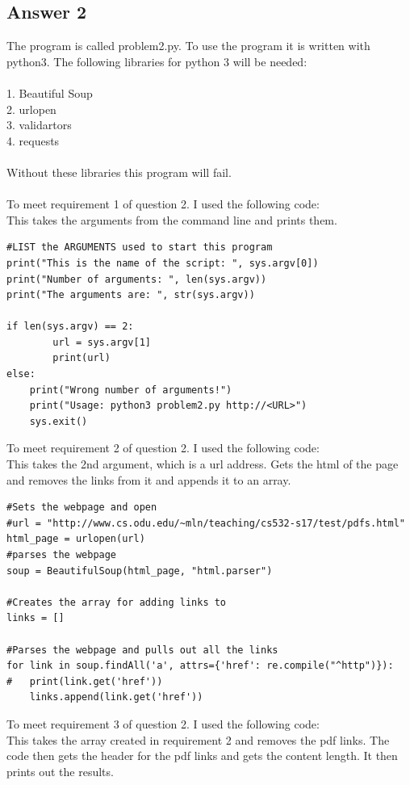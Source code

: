 \documentclass[10pt,letterpaper]{article}
\begin{document}
\subsection{Answer 2}
The program is called problem2.py.  To use the program it is written with python3.  The following libraries for python 3 will be needed:\\
\\
1. Beautiful Soup\\
2. urlopen\\
3. validartors\\
4. requests\\
\\
Without these libraries this program will fail.\\
\\
To meet requirement 1 of question 2.  I used the following code:\\
This takes the arguments from the command line and prints them.
\begin{lstlisting}
#LIST the ARGUMENTS used to start this program
print("This is the name of the script: ", sys.argv[0])
print("Number of arguments: ", len(sys.argv))
print("The arguments are: ", str(sys.argv))

if len(sys.argv) == 2:
        url = sys.argv[1]
        print(url)
else:
	print("Wrong number of arguments!")
	print("Usage: python3 problem2.py http://<URL>")
	sys.exit()
\end{lstlisting}
To meet requirement 2 of question 2. I used the following code:\\
This takes the 2nd argument, which is a url address.  Gets the html of the page and removes the links from it and appends it to an array.
\cite{bsdoc_2015}
\cite{digitalocean_2017}
\begin{lstlisting}
#Sets the webpage and open
#url = "http://www.cs.odu.edu/~mln/teaching/cs532-s17/test/pdfs.html" 
html_page = urlopen(url)
#parses the webpage 
soup = BeautifulSoup(html_page, "html.parser")

#Creates the array for adding links to
links = []

#Parses the webpage and pulls out all the links
for link in soup.findAll('a', attrs={'href': re.compile("^http")}):
#	print(link.get('href'))
	links.append(link.get('href'))
\end{lstlisting}
To meet requirement 3 of question 2. I used the following code:\\
This takes the array created in requirement 2 and removes the pdf links.  The code then gets the header for the pdf links and gets the content length.  It then prints out the results.
\end{document}
